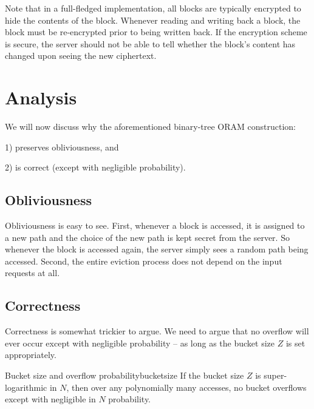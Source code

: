 \begin{remark}{}{}
Note that in a full-fledged implementation,
all blocks are typically encrypted to hide the contents of the block.
Whenever reading and writing back a block, the block
must be re-encrypted prior to being written back.
If the encryption scheme is secure, the server should not be able
to tell whether the block's content has changed
upon seeing the new ciphertext.
\end{remark}

\section{Analysis}\label{analysis}

We will now discuss why the aforementioned binary-tree ORAM construction:

1) preserves obliviousness, and

2) is correct (except with negligible probability).

\subsection{Obliviousness}\label{obliviousness.}

Obliviousness is easy to see.
First, whenever a block is accessed, it is assigned to a new path and
the choice of the new path is kept secret from the server. So whenever
the block is accessed again, the server simply sees a random path being
accessed.
Second, the entire eviction process does not depend on the input
requests at all.

\subsection{Correctness}\label{correctness.}

Correctness is somewhat trickier to argue. We need to argue that
no overflow will ever occur except
with negligible probability -- as long as the bucket size $Z$ is set
appropriately.

\begin{proposition}{Bucket size and overflow probability}{bucketsize}
If the bucket size $Z$ is
super-logarithmic in $N$, then over any polynomially many accesses, no
bucket overflows except with negligible in $N$ probability.
\end{proposition}

